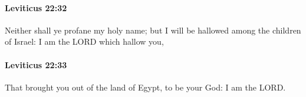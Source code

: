 		\paragraph{Leviticus 22:32} %
			\label{LEVITICUS-22-32}

			Neither shall ye profane my holy name; but I will be hallowed among the children of Israel: I am the LORD which hallow you,


		\paragraph{Leviticus 22:33} %
			\label{LEVITICUS-22-33}

			That brought you out of the land of Egypt, to be your God: I am the LORD.

